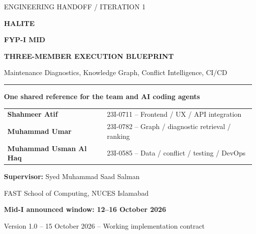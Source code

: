 \documentclass[11pt,a4paper,oneside]{report}
\begin{document}
\begin{titlepage}
\begin{center}
\vspace*{0.55in}
{\sffamily\color{sea}\fontsize{17}{20}\selectfont ENGINEERING HANDOFF / ITERATION 1}\par
\vspace{.30in}
{\sffamily\bfseries\color{ink}\fontsize{37}{42}\selectfont HALITE}\par
\vspace{.24in}
{\sffamily\bfseries\fontsize{23}{29}\selectfont FYP-I MID\par}\vspace{.13in}
{\sffamily\bfseries\fontsize{18}{23}\selectfont THREE-MEMBER EXECUTION BLUEPRINT\par}
\vspace{.27in}
{\sffamily\color{muted}\large Maintenance Diagnostics, Knowledge Graph, Conflict Intelligence, CI/CD}\par
\vspace{.5in}
\rule{\textwidth}{1pt}\par\vspace{.28in}
{\large \textbf{One shared reference for the team and AI coding agents}}\par
\vspace{.22in}
\begin{tabular}{ll}
\textbf{Shahmeer Atif} & 23I-0711 -- Frontend / UX / API integration\\
\textbf{Muhammad Umar} & 23I-0782 -- Graph / diagnostic retrieval / ranking\\
\textbf{Muhammad Usman Al Haq} & 23I-0585 -- Data / conflict / testing / DevOps\\
\end{tabular}
\vfill
{\bfseries Supervisor:} Syed Muhammad Saad Salman\par
\vspace{.16in}
FAST School of Computing, NUCES Islamabad\par
\vspace{.2in}
{\bfseries Mid-I announced window: 12--16 October 2026}\par
\vspace{.12in}
{\small Version 1.0 -- 15 October 2026 -- Working implementation contract}\par
\end{center}
\end{titlepage}
\hypersetup{pageanchor=false}
\end{document}
